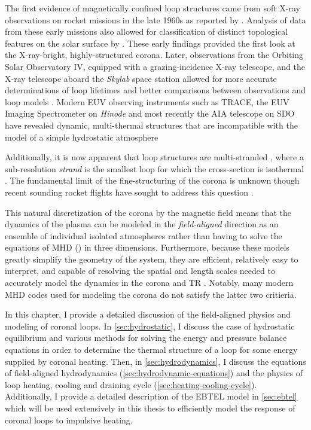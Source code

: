 The first evidence of magnetically confined loop structures came from soft X-ray observations on rocket missions in the late 1960s as reported by \citet{vaiana_x-ray_1968}. Analysis of data from these early missions also allowed for classification of distinct topological features on the solar surface by \citet{vaiana_identification_1973}. These early findings provided the first look at the X-ray-bright, highly-structured corona. Later, observations from the Orbiting Solar Observatory IV, equipped with a grazing-incidence X-ray telescope, and the X-ray telescope aboard the \textit{Skylab} space station \citep{krieger_results_1972,reale_coronal_2010} allowed for more accurate determinations of loop lifetimes and better comparisons between observations and loop models \citep{rosner_dynamics_1978}. Modern EUV observing instruments such as TRACE, the EUV Imaging Spectrometer \citep[EIS,][]{culhane_euv_2007} on \textit{Hinode} and most recently the AIA telescope on SDO have revealed dynamic, multi-thermal structures that are incompatible with the model of a simple hydrostatic atmosphere \citep[e.g.][]{warren_hydrodynamic_2002,winebarger_steady_2002,del_zanna_flows_2008,viall_evidence_2012} 

Additionally, it is now apparent that loop structures are multi-stranded \citep{gomez_normal_1993}, where a sub-resolution \textit{strand} is the smallest loop for which the cross-section is isothermal \citep{bradshaw_diagnosing_2012}. The fundamental limit of the fine-structuring of the corona is unknown though recent sounding rocket flights have sought to address this question \citep{cirtain_energy_2013,aschwanden_width_2017}.

This natural discretization of the corona by the magnetic field means that the dynamics of the plasma can be modeled in the \textit{field-aligned} direction as an ensemble of individual isolated atmospheres rather than having to solve the equations of MHD () in three dimensions. Furthermore, because these models greatly simplify the geometry of the system, they are efficient, relatively easy to interpret, and capable of resolving the spatial and length scales needed to accurately model the dynamics in the corona and TR \citep{bradshaw_influence_2013}. Notably, many modern MHD codes used for modeling the corona do not satisfy the latter two critieria.

In this chapter, I provide a detailed discussion of the field-aligned physics and modeling of coronal loops. In \autoref{sec:hydrostatic}, I discuss the case of hydrostatic equilibrium and various methods for solving the energy and pressure balance equations in order to determine the thermal structure of a loop for some energy supplied by coronal heating. Then, in \autoref{sec:hydrodynamics}, I discuss the equations of field-aligned hydrodynamics (\autoref{sec:hydrodynamic-equations}) and the physics of loop heating, cooling and draining cycle (\autoref{sec:heating-cooling-cycle}). Additionally, I provide a detailed description of the EBTEL model in \autoref{sec:ebtel} which will be used extensively in this thesis to efficiently model the response of coronal loops to impulsive heating.

